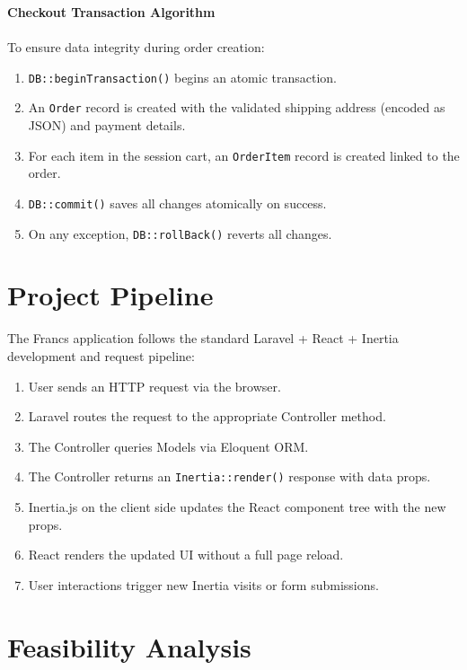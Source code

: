 {\large \textbf{Checkout Transaction Algorithm}}\\\\
To ensure data integrity during order creation:
\begin{enumerate}
    \item \texttt{DB::beginTransaction()} begins an atomic transaction.
    \item An \texttt{Order} record is created with the validated shipping address (encoded as JSON) and payment details.
    \item For each item in the session cart, an \texttt{OrderItem} record is created linked to the order.
    \item \texttt{DB::commit()} saves all changes atomically on success.
    \item On any exception, \texttt{DB::rollBack()} reverts all changes.
\end{enumerate}

\section{Project Pipeline}
The Francs application follows the standard Laravel + React + Inertia development and request pipeline:

\begin{enumerate}
    \item User sends an HTTP request via the browser.
    \item Laravel routes the request to the appropriate Controller method.
    \item The Controller queries Models via Eloquent ORM.
    \item The Controller returns an \texttt{Inertia::render()} response with data props.
    \item Inertia.js on the client side updates the React component tree with the new props.
    \item React renders the updated UI without a full page reload.
    \item User interactions trigger new Inertia visits or form submissions.
\end{enumerate}

\section{Feasibility Analysis}

